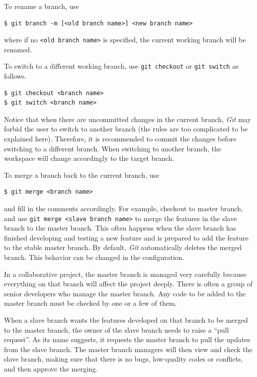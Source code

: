 To rename a branch, use
\begin{lstlisting}
$ git branch -m [<old branch name>] <new branch name>
\end{lstlisting}
where if no \verb|<old branch name>| is specified, the current working branch will be renamed.

To switch to a different working branch, use \verb|git checkout| or \verb|git switch| as follows.
\begin{lstlisting}
$ git checkout <branch name>
$ git switch <branch name>
\end{lstlisting}
Notice that when there are uncommitted changes in the current branch, \textit{Git} may forbid the user to switch to another branch (the rules are too complicated to be explained here). Therefore, it is recommended to commit the changes before switching to a different branch. When switching to another branch, the workspace will change accordingly to the target branch.

To merge a branch back to the current branch, use
\begin{lstlisting}
$ git merge <branch name>
\end{lstlisting}
and fill in the comments accordingly. For example, checkout to master branch, and use \verb|git merge <slave branch name>| to merge the features in the slave branch to the master branch. This often happens when the slave branch has finished developing and testing a new feature and is prepared to add the feature to the stable master branch. By default, \textit{Git} automatically deletes the merged branch. This behavior can be changed in the configuration.

\begin{shortbox}

In a collaborative project, the master branch is managed very carefully because everything on that branch will affect the project deeply. There is often a group of senior developers who manage the master branch. Any code to be added to the master branch must be checked by one or a few of them.

When a slave branch wants the features developed on that branch to be merged to the master branch, the owner of the slave branch needs to raise a ``pull request''. As its name suggests, it requests the master branch to pull the updates from the slave branch. The master branch managers will then view and check the slave branch, making sure that there is no bugs, low-quality codes or conflicts, and then approve the merging.

\end{shortbox}

